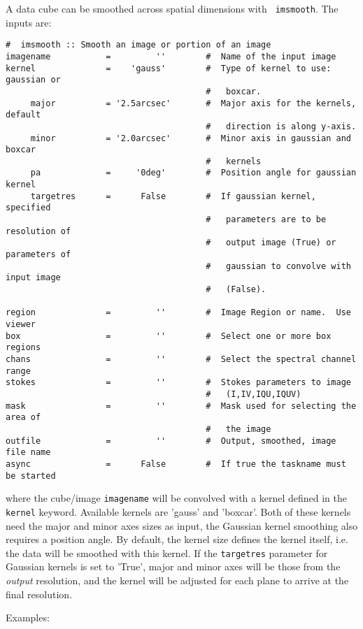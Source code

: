A data cube can be smoothed across spatial dimensions with {\tt
  imsmooth}. The inputs are:\\ 
\small
\begin{verbatim}
#  imsmooth :: Smooth an image or portion of an image
imagename           =         ''        #  Name of the input image
kernel              =    'gauss'        #  Type of kernel to use: gaussian or
                                        #   boxcar.
     major          = '2.5arcsec'       #  Major axis for the kernels, default
                                        #   direction is along y-axis.
     minor          = '2.0arcsec'       #  Minor axis in gaussian and boxcar
                                        #   kernels
     pa             =     '0deg'        #  Position angle for gaussian kernel
     targetres      =      False        #  If gaussian kernel, specified
                                        #   parameters are to be resolution of
                                        #   output image (True) or parameters of
                                        #   gaussian to convolve with input image
                                        #   (False).

region              =         ''        #  Image Region or name.  Use viewer
box                 =         ''        #  Select one or more box regions
chans               =         ''        #  Select the spectral channel range
stokes              =         ''        #  Stokes parameters to image
                                        #   (I,IV,IQU,IQUV)
mask                =         ''        #  Mask used for selecting the area of
                                        #   the image
outfile             =         ''        #  Output, smoothed, image file name
async               =      False        #  If true the taskname must be started
\end{verbatim}
\normalsize
where the cube/image {\tt imagename} will be convolved with a kernel
defined in the {\tt kernel} keyword. Available kernels are 'gauss' and
'boxcar'. Both of these kernels need the major and minor axes sizes as
input, the Gaussian kernel smoothing also requires a position
angle. By default, the kernel size defines the kernel itself, i.e. the
data will be smoothed with this kernel. If the {\tt targetres} parameter
for Gaussian kernels is set to 'True', major and minor axes will be
those from the {\it output} resolution, and the kernel will be
adjusted for each plane to arrive at the final resolution. 

Examples: \\

